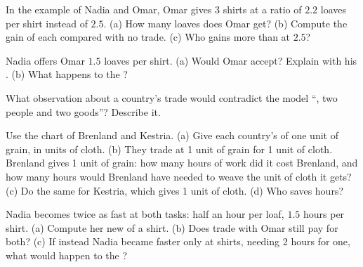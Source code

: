 \begin{exercise}[$\star\star$]\label{exo:g7:comparative-advantage:7}
In the example of Nadia and Omar, Omar gives 3 shirts at a ratio of $2.2$ loaves per
shirt instead of $2.5$. (a) How many loaves does Omar get? (b) Compute the gain of each
compared with no trade. (c) Who gains more than at $2.5$?
\end{exercise}

\begin{exercise}[$\star\star$]\label{exo:g7:comparative-advantage:8}
Nadia offers Omar $1.5$ loaves per shirt. (a) Would Omar accept? Explain with his
. (b) What happens to the ?
\end{exercise}

\begin{exercise}[$\star\star$]\label{exo:g7:comparative-advantage:9}
What observation about a country's trade would contradict the model ``, two people and two goods''? Describe it.
\end{exercise}

\begin{exercise}[$\star\star\star$]\label{exo:g7:comparative-advantage:10}
Use the chart of Brenland and Kestria. (a) Give each country's  of one unit
of grain, in units of cloth. (b) They trade at 1 unit of grain for 1 unit of cloth.
Brenland gives 1 unit of grain: how many hours of work did it cost Brenland, and how many
hours would Brenland have needed to weave the unit of cloth it gets? (c) Do the same
for Kestria, which gives 1 unit of cloth. (d) Who saves hours?
\end{exercise}

\begin{exercise}[$\star\star\star$]\label{exo:g7:comparative-advantage:11}
Nadia becomes twice as fast at both tasks: half an hour per loaf, $1.5$ hours per shirt.
(a) Compute her new  of a shirt. (b) Does trade with Omar still pay for
both? (c) If instead Nadia became faster only at shirts, needing 2 hours for one, what
would happen to the ?
\end{exercise}

